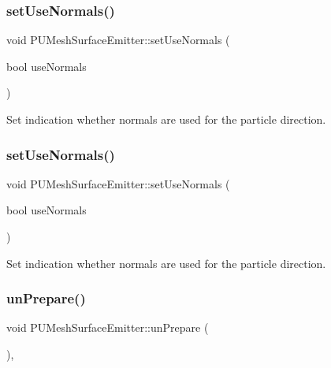 \subsubsection{\texorpdfstring{set\+Use\+Normals()}{setUseNormals()}\hspace{0.1cm}{\footnotesize\ttfamily [1/2]}}
{\footnotesize\ttfamily void P\+U\+Mesh\+Surface\+Emitter\+::set\+Use\+Normals (\begin{DoxyParamCaption}\item[{bool}]{use\+Normals }\end{DoxyParamCaption})}

Set indication whether normals are used for the particle direction. \mbox{\label{classPUMeshSurfaceEmitter_a688415b477c759993754d5b25957fc78}} 
\subsubsection{\texorpdfstring{set\+Use\+Normals()}{setUseNormals()}\hspace{0.1cm}{\footnotesize\ttfamily [2/2]}}
{\footnotesize\ttfamily void P\+U\+Mesh\+Surface\+Emitter\+::set\+Use\+Normals (\begin{DoxyParamCaption}\item[{bool}]{use\+Normals }\end{DoxyParamCaption})}

Set indication whether normals are used for the particle direction. \mbox{\label{classPUMeshSurfaceEmitter_a7f222315d8d78d213baa3412d6db3397}} 
\subsubsection{\texorpdfstring{un\+Prepare()}{unPrepare()}\hspace{0.1cm}{\footnotesize\ttfamily [1/2]}}
{\footnotesize\ttfamily void P\+U\+Mesh\+Surface\+Emitter\+::un\+Prepare (\begin{DoxyParamCaption}{ }\end{DoxyParamCaption})\hspace{0.3cm}{\ttfamily [override]}, {\ttfamily [virtual]}}

